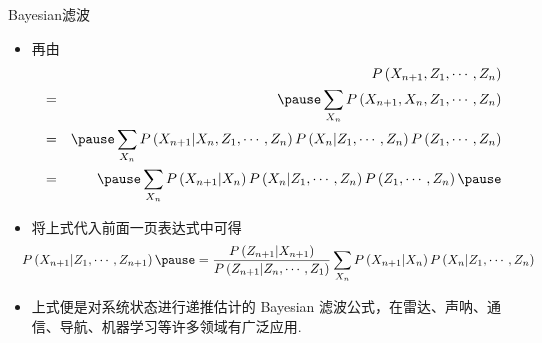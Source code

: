 \documentclass[Prob-All.tex]{subfiles}
\begin{document}
\begin{frame}{{\rm Bayesian}滤波}
	\begin{itemize}[<+-|alert@+>]
		\item 再由\pause
		{\small \begin{eqnarray*}
			&&P\left(X_{n+1}, Z_{1}, \cdots, Z_{n}\right)\\
			&=&\pause\sum_{X_{n}} P\left(X_{n+1}, X_{n}, Z_{1}, \cdots, Z_{n}\right) \\
			&=&\pause\sum_{X_{n}} P\left(X_{n+1} | X_{n}, Z_{1}, \cdots, Z_{n}\right) P\left(X_{n} | Z_{1}, \cdots, Z_{n}\right) P\left(Z_{1}, \cdots, Z_{n}\right) \\
			&=&\pause\sum_{X_{n}} P\left(X_{n+1} | X_{n}\right) P\left(X_{n} | Z_{1}, \cdots, Z_{n}\right) P\left(Z_{1}, \cdots, Z_{n}\right)\pause
		\end{eqnarray*}}
	    \item 将上式代入前面一页表达式中可得
	{\small \[
		\hspace{-0.3cm} P\left(X_{n+1} | Z_{1}, \cdots, Z_{n+1}\right)\pause=\frac{P\left(Z_{n+1} | X_{n+1}\right)}{P\left(Z_{n+1} | Z_{n}, \cdots, Z_{1}\right)} \sum_{X_{n}} P\left(X_{n+1} | X_{n}\right) P\left(X_{n} | Z_{1}, \cdots, Z_{n}\right)\]}
		\item 上式便是对系统状态进行递推估计的 Bayesian 滤波公式，在雷达、声呐、通信、导航、机器学习等许多领域有广泛应用.

	\end{itemize}






	\end{frame}
\end{document}
